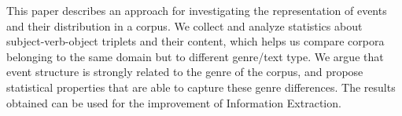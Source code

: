 This paper describes an approach for investigating the representation of events and their distribution in a corpus. We collect and analyze statistics about
 subject-verb-object triplets and their content, which helps us compare corpora
 belonging to the same domain but to different genre/text type. We argue that
 event structure is strongly related to the genre of the corpus, and propose
 statistical properties that are able to capture these genre differences. The
 results obtained can be used for the improvement of Information Extraction.

